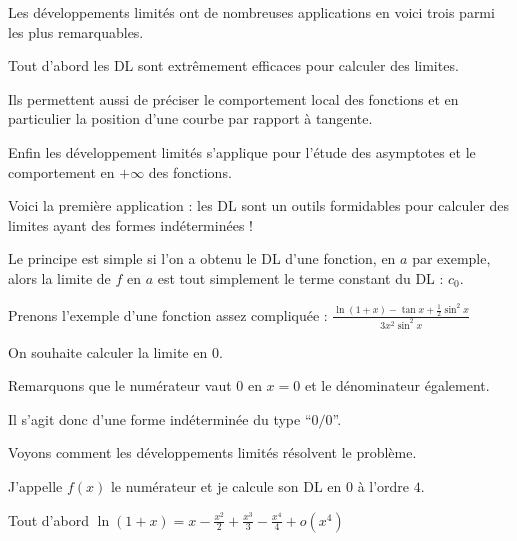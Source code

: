 







\debuttexte

\diapo


\change

Les développements limités ont de nombreuses applications
en voici trois parmi les plus remarquables.

\change

Tout d'abord les DL sont extrêmement efficaces pour calculer
des limites.

\change

Ils permettent aussi de préciser le comportement local des fonctions
et en particulier la position d'une courbe par rapport à tangente.

\change 

Enfin les développement limités s'applique pour l'étude des asymptotes et le comportement 
en $+\infty$ des fonctions.


\diapo


Voici la première application : les DL sont un outils formidables 
pour calculer des limites ayant des formes indéterminées !

Le principe est simple si l'on a obtenu le DL d'une fonction, en $a$ par exemple,
alors la limite de $f$ en $a$ est tout simplement le terme constant du DL : $c_0$.

\change

Prenons l'exemple d'une fonction assez compliquée :
$\frac{\ln(1+x)-\tan x+\frac{1}{2}\sin^2x}{3x^2\sin^2x}$

On souhaite calculer la limite en $0$.

Remarquons que le numérateur vaut $0$ en $x=0$ et le dénominateur également.

Il s'agit donc d'une forme indéterminée du type ``$0/0$''.

Voyons comment les développements limités résolvent le problème.


\change

J'appelle $f(x)$ le numérateur 
et je calcule son DL en $0$ à l'ordre $4$.

\change

Tout d'abord $\ln(1+x)=x-\frac{x^2}{2}+\frac{x^3}{3}-\frac{x^4}{4}+o(x^4)$

